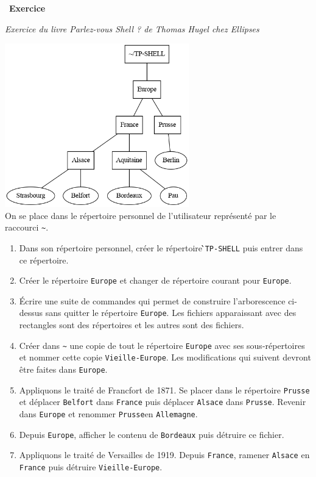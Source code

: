 \documentclass[
  11pt,
]{article}
\providecommand{\tightlist}{%
  \setlength{\itemsep}{0pt}\setlength{\parskip}{0pt}}
\newcounter{exo}
\newenvironment{exercice}[1]
{\par \medskip   \addtocounter{exo}{1} \noindent  
\begin{bclogo}[arrondi =0.1,   noborder = true, logo=\bccrayon, marge=4]{~\textbf{Exercice} \textbf{\theexo} {\itshape #1} }  \par}
{
\end{bclogo}
 \par \bigskip }
\newcounter{def}
\begin{document}
\begin{exercice}{}

\emph{Exercice du livre Parlez-vous Shell ? de Thomas Hugel chez
Ellipses}

\includegraphics[width=0.6\textwidth,height=\textheight]{images/graphe-europe.png}\\

On se place dans le répertoire personnel de l'utilisateur représenté par
le raccourci \texttt{\textasciitilde{}}.

\begin{enumerate}
\def\labelenumi{\arabic{enumi}.}
\tightlist
\item
  Dans son répertoire personnel, créer le répertoire ̀̀\texttt{TP-SHELL}
  puis entrer dans ce répertoire.
\item
  Créer le répertoire \texttt{Europe} et changer de répertoire courant
  pour \texttt{Europe}.
\item
  Écrire une suite de commandes qui permet de construire l'arborescence
  ci-dessus sans quitter le répertoire \texttt{Europe}. Les fichiers
  apparaissant avec des rectangles sont des répertoires et les autres
  sont des fichiers.
\item
  Créer dans \texttt{\textasciitilde{}} une copie de tout le répertoire
  \texttt{Europe} avec ses sous-répertoires et nommer cette copie
  \texttt{Vieille-Europe}. Les modifications qui suivent devront être
  faites dans \texttt{Europe}.
\item
  Appliquons le traité de Francfort de 1871. Se placer dans le
  répertoire \texttt{Prusse} et déplacer \texttt{Belfort} dans
  \texttt{France} puis déplacer \texttt{Alsace} dans \texttt{Prusse}.
  Revenir dans \texttt{Europe} et renommer \texttt{Prusse}en
  \texttt{Allemagne}.
\item
  Depuis \texttt{Europe}, afficher le contenu de \texttt{Bordeaux} puis
  détruire ce fichier.
\item
  Appliquons le traité de Versailles de 1919. Depuis \texttt{France},
  ramener \texttt{Alsace} en \texttt{France} puis détruire
  \texttt{Vieille-Europe}.
\end{enumerate}

\end{exercice}
\end{document}
